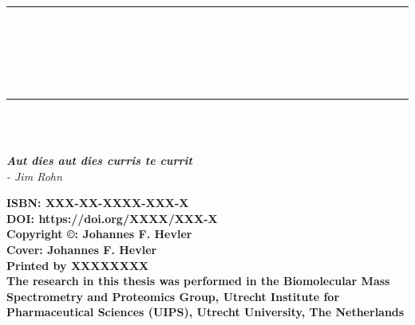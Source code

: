 \cleardoublepage
\pagestyle{empty} %
\frontmatter %

\begin{titlepage}
    \begin{center}
        \rule{\textwidth}{1.5pt}\\[0cm]
        {\huge \bfseries \thesistitle \par \ }\\[-0.5cm]
        \rule{\textwidth}{1.5pt}\\[2.5cm]
        {\large \bfseries\name}\\
        [2cm]
        \begin{small}
            \emph{\textbf{Aut dies aut dies curris te currit} \\
                - Jim Rohn}
        \end{small}
    \end{center}
    \clearpage
    \begin{flushleft}
        \vspace*{\fill}

        {\small \textbf{ISBN: XXX-XX-XXXX-XXX-X}\\
        \textbf{DOI: https://doi.org/XXXX/XXX-X}\\
        [0.5cm]
        \textbf{Copyright ©: Johannes F. Hevler}\\
        \textbf{Cover: Johannes F. Hevler}\\
        \textbf{Printed by XXXXXXXX}\\
        [0.5cm]
        \textbf{The research in this thesis was performed in the Biomolecular Mass
            Spectrometry and Proteomics Group, Utrecht Institute for Pharmaceutical Sciences (UIPS), Utrecht University, The Netherlands}}

    \end{flushleft}
    \clearpage


\end{titlepage}

